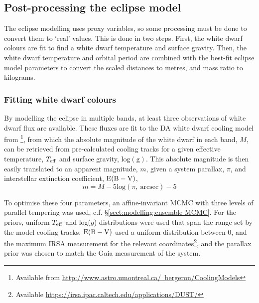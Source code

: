 \subsection{Post-processing the eclipse model}
\label{sect:modelling:post processing the eclipse model}

The eclipse modelling uses proxy variables, so some processing must be done to convert them to `real' values. This is done in two steps. First, the white dwarf colours are fit to find a white dwarf temperature and surface gravity. Then, the white dwarf temperature and orbital period are combined with the best-fit eclipse model parameters to convert the scaled distances to metres, and mass ratio to kilograms.

\subsubsection{Fitting white dwarf colours}
\label{sect:modelling:fitting white dwarf colours}
By modelling the eclipse in multiple bands, at least three observations of white dwarf flux are available. These fluxes are fit to the DA white dwarf cooling model from \citet{Bergeron1995}\footnote{Available from \href{http://www.astro.umontreal.ca/~bergeron/CoolingModels}{http://www.astro.umontreal.ca/~bergeron/CoolingModels}}, from which the absolute magnitude of the white dwarf in each band, $M$, can be retrieved from pre-calculated cooling tracks for a given effective temperature, $T_{\rm eff}$ and surface gravity, $\mathrm{log(g)}$. This absolute magnitude is then easily translated to an apparent magnitude, $m$, given a system parallax, $\pi$, and interstellar extinction coefficient, $\rm E(B-V)$,
\begin{equation}
    m = M - 5\mathrm{log}(\pi\mathrm{,\ arcsec}) - 5
\end{equation}

To optimise these four parameters, an affine-invariant MCMC with three levels of parallel tempering was used, c.f. \S\ref{sect:modelling:ensemble MCMC}. For the priors, uniform $T_{\rm eff}$ and log($g$) distributions were used that span the range set by the model cooling tracks. $\rm E(B-V)$ used a uniform distribution between 0, and the maximum IRSA measurement for the relevant coordinates\footnote{Available \href{https://irsa.ipac.caltech.edu/applications/DUST/}{https://irsa.ipac.caltech.edu/applications/DUST/}}, and the parallax prior was chosen to match the Gaia measurement \citep{lindegren2018, Luri2018, Gaia2016, Gaia2018} of the system.


